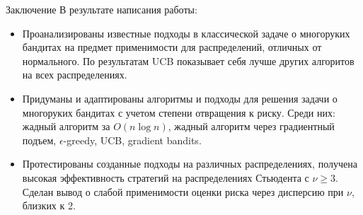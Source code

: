 \documentclass[10pt]{beamer} %
\begin{document}
\begin{frame}{Заключение}
    В результате написания работы:
    \begin{itemize}
        \item<1-> Проанализированы известные подходы в классической задаче о многоруких бандитах на предмет применимости для распределений, отличных от нормального. По результатам UCB показывает себя лучше других алгоритов на всех распределениях.
        \item<2-> Придуманы и адаптированы алгоритмы и подходы для решения задачи о многоруких бандитах с учетом степени отвращения к риску. Среди них: жадный алгоритм за $O(n \log n)$, жадный алгоритм через градиентный подъем, $\epsilon$-greedy, UCB, gradient bandits.
        \item<3-> Протестированы созданные подходы на различных распределениях, получена высокая эффективность стратегий на распределениях Стьюдента с $\nu \geq 3$. Сделан вывод о слабой применимости оценки риска через дисперсию при $\nu$, близких к 2.
    \end{itemize}
\end{frame}
\end{document}
